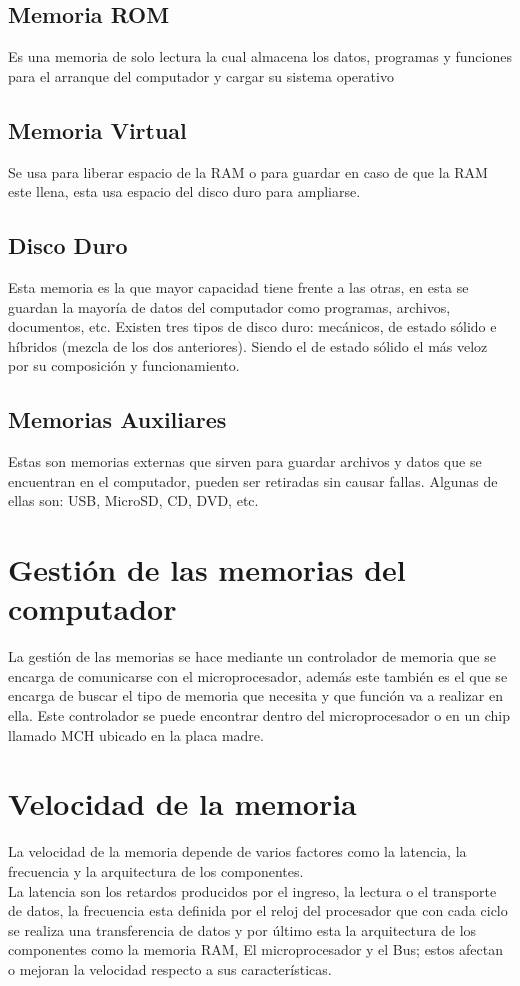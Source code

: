 \documentclass{article}
\begin{document}
	\subsection{Memoria ROM}
	Es una memoria de solo lectura la cual almacena los datos, programas y funciones para el arranque del computador y cargar su sistema operativo\cite{rom}
	
	\subsection{Memoria Virtual}
	Se usa para liberar espacio de la RAM o para guardar en caso de que la RAM este llena, esta usa espacio del disco duro para ampliarse.
	
	\subsection{Disco Duro}
	Esta memoria es la que mayor capacidad tiene frente a las otras, en esta se guardan la mayoría de datos del computador como programas, archivos, documentos, etc. Existen tres tipos de disco duro: mecánicos, de estado sólido e híbridos (mezcla de los dos anteriores). Siendo el de estado sólido el más veloz por su composición y funcionamiento.
	
	\subsection{Memorias Auxiliares}
	Estas son memorias externas que sirven para guardar archivos y datos que se encuentran en el computador, pueden ser retiradas sin causar fallas. Algunas de ellas son: USB, MicroSD, CD, DVD, etc.
	
	\section{Gestión de las memorias del computador}
	La gestión de las memorias se hace mediante un controlador de memoria que se encarga de comunicarse con el microprocesador, además este también es el que se encarga de buscar el tipo de memoria que necesita y que función va a realizar en ella.
	Este controlador se puede encontrar dentro del microprocesador o en un chip llamado MCH ubicado en la placa madre.\cite{memoria}
	
	\section{Velocidad de la memoria}
	La velocidad de la memoria depende de varios factores como la latencia, la frecuencia y la arquitectura de los componentes.\\
	La latencia son los retardos producidos por el ingreso,
	la lectura o el transporte de datos, la frecuencia esta definida por el reloj del procesador que con cada ciclo se realiza una transferencia de datos y por último esta la arquitectura de los componentes como la memoria RAM,
	El microprocesador y el Bus; estos afectan o mejoran la velocidad respecto a sus características.\cite{velocidad}\\
	
\end{document}
